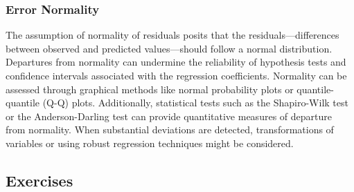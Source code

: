 \documentclass{article}
\begin{document}
\subsubsection{Error Normality}

The assumption of normality of residuals posits that the residuals—differences between observed and predicted values—should follow a normal distribution. Departures from normality can undermine the reliability of hypothesis tests and confidence intervals associated with the regression coefficients. Normality can be assessed through graphical methods like normal probability plots or quantile-quantile (Q-Q) plots. Additionally, statistical tests such as the Shapiro-Wilk test or the Anderson-Darling test can provide quantitative measures of departure from normality. When substantial deviations are detected, transformations of variables or using robust regression techniques might be considered.

\subsection{Exercises}
\end{document}
